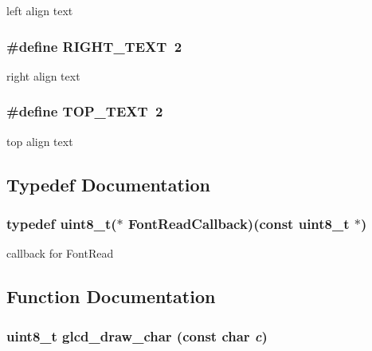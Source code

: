 left align text \hypertarget{group__graphic__device__font_g17e416c21fb4d19bc55179c55d452de9}{
\subsubsection[{RIGHT\_\-TEXT}]{\setlength{\rightskip}{0pt plus 5cm}\#define RIGHT\_\-TEXT~2}}
\label{group__graphic__device__font_g17e416c21fb4d19bc55179c55d452de9}


right align text \hypertarget{group__graphic__device__font_gffe790b2fe3846e872da3498e2ec2f43}{
\subsubsection[{TOP\_\-TEXT}]{\setlength{\rightskip}{0pt plus 5cm}\#define TOP\_\-TEXT~2}}
\label{group__graphic__device__font_gffe790b2fe3846e872da3498e2ec2f43}


top align text 

\subsection{Typedef Documentation}
\hypertarget{group__graphic__device__font_ge7d259c434193cdc93d4d4136d77612a}{
\subsubsection[{FontReadCallback}]{\setlength{\rightskip}{0pt plus 5cm}typedef uint8\_\-t($\ast$ {\bf FontReadCallback})(const uint8\_\-t $\ast$)}}
\label{group__graphic__device__font_ge7d259c434193cdc93d4d4136d77612a}


callback for FontRead 

\subsection{Function Documentation}
\hypertarget{group__graphic__device__font_ged8f749179799860fc51de0900f6460a}{
\subsubsection[{glcd\_\-draw\_\-char}]{\setlength{\rightskip}{0pt plus 5cm}uint8\_\-t glcd\_\-draw\_\-char (const char {\em c})}}
\label{group__graphic__device__font_ged8f749179799860fc51de0900f6460a}


